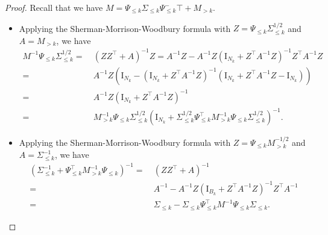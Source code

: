 \documentclass[10pt,a4paper]{amsart}
\begin{document}
\begin{proof}
Recall that we have $M = \Psi_{\leq k} \Sigma_{\leq k} \Psi_{\leq k}^-{\top} + M_{>k}$. 
\begin{itemize}
    \item Applying the Sherman-Morrison-Woodbury formula with $Z= \Psi_{\leq k} \Sigma_{\leq k}^{1/2}$ and $A=M_{>k}$, we have
    \begin{equation*}
    \begin{aligned}
        M^{-1} \Psi_{\leq k} \Sigma_{\leq k}^{1/2} 
        = &~  (ZZ^{\top} + A)^{-1} Z
        = A^{-1}Z - A^{-1} Z(\mathrm{I}_{N_{k}} + Z^{\top} A^{-1} Z)^{-1} Z^{\top} A^{-1}Z\\
        =&~
        A^{-1}Z \left(\mathrm{I}_{N_{k}} - (\mathrm{I}_{N_{k}} + Z^{\top} A^{-1} Z)^{-1} \left(\mathrm{I}_{N_{k}} + Z^{\top} A^{-1} Z - \mathrm{I}_{N_{k}}\right)\right)
        \\
        =&~
        A^{-1} Z \left( \mathrm{I}_{N_{k}} +  Z^{\top} A^{-1} Z\right)^{-1}
        \\
        =&~
        M_{>k}^{-1} \Psi_{\leq k} \Sigma_{\leq k}^{1/2} \left( \mathrm{I}_{N_{k}} +  \Sigma_{\leq k}^{1/2}  \Psi_{\leq k}^{\top} M_{>k}^{-1} \Psi_{\leq k} \Sigma_{\leq k}^{1/2}\right)^{-1}.
    \end{aligned}
\end{equation*}

\item Applying the Sherman-Morrison-Woodbury formula with $Z= \Psi_{\leq k} M_{> k}^{-1/2}$ and $A=\Sigma_{\leq k}^{-1}$, we have
\begin{equation*}
    \begin{aligned}
        \left( \Sigma_{\leq k}^{-1} + \Psi_{\leq k}^{\top} M_{>k}^{-1} \Psi_{\leq k}  \right)^{-1}
        = &~
        (ZZ^{\top} + A)^{-1}\\
        = &~
        A^{-1} - A^{-1} Z(\mathrm{I}_{B_{k}} + Z^{\top} A^{-1} Z)^{-1} Z^{\top} A^{-1}\\
        = &~
        \Sigma_{\leq k} - \Sigma_{\leq k} \Psi^{\top}_{\leq k} M^{-1} \Psi_{\leq k}\Sigma_{\leq k}.
    \end{aligned}
\end{equation*}
\end{itemize}
\end{proof}
\end{document}
